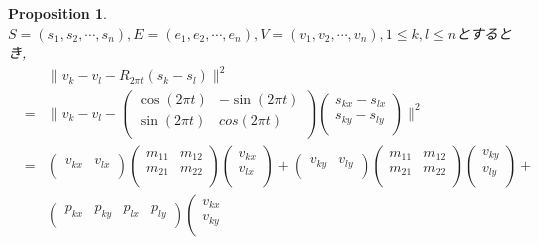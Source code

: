 \documentclass[8pt]{article}
\newtheorem{prop}{\bf Proposition}
\begin{document}
\begin{prop}
$S = (s_1,s_2,\cdots ,s_n),E = (e_1,e_2, \cdots ,e_n),V = (v_1,v_2,\cdots,v_n), 1 \leq k,l \leq n$とするとき,\\
\begin{eqnarray*}
&&\|v_k - v_l - R_{2 \pi t}(s_k - s_l)\|^2\\
&=& \|v_k - v_l - \left(
 \begin{array}{cc}
 \cos(2\pi t)& -\sin(2\pi t)\\
 \sin(2\pi t)&cos(2\pi t)\\
 \end{array}
\right)\left(
 \begin{array}{c}
  s_{kx} - s_{lx}\\
  s_{ky} - s_{ly}\\
 \end{array}
 \right)\|^2\\
&=&\left(\begin{array}{cc}
v_{kx}&v_{lx}\\
\end{array}\right)
\left(\begin{array}{cc}
 m_{11}&m_{12}\\
 m_{21}&m_{22}\\
\end{array}\right)
\left(\begin{array}{c}
 v_{kx}\\
 v_{lx}\\
\end{array}\right) + \left(\begin{array}{cc}
v_{ky}&v_{ly}\\
\end{array}\right)
\left(\begin{array}{cc}
 m_{11}&m_{12}\\
 m_{21}&m_{22}\\
\end{array}\right)
\left(\begin{array}{c}
 v_{ky}\\
 v_{ly}\\
\end{array}\right) + \\
&& \left(\begin{array}{cccc}
 p_{kx} & p_{ky} & p_{lx} & p_{ly}\\
\end{array}\right)\left(\begin{array}{c}
 v_{kx}\\
 v_{ky}\\

\end{array}
\end{eqnarray*}
\end{prop}
\end{document}
